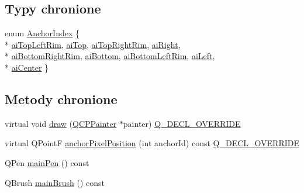 \subsection*{Typy chronione}
\begin{DoxyCompactItemize}
\item 
enum \hyperlink{class_q_c_p_item_ellipse_a415009889543169f35b70795f415e45e}{Anchor\+Index} \{ \\*
\hyperlink{class_q_c_p_item_ellipse_a415009889543169f35b70795f415e45eab2538849b88921e7fc1dcc15b2a6109d}{ai\+Top\+Left\+Rim}, 
\hyperlink{class_q_c_p_item_ellipse_a415009889543169f35b70795f415e45ea83e55b0c1799baac1eecab52bcbe096d}{ai\+Top}, 
\hyperlink{class_q_c_p_item_ellipse_a415009889543169f35b70795f415e45ea415d82233c14f0c70c245d50e706e75b}{ai\+Top\+Right\+Rim}, 
\hyperlink{class_q_c_p_item_ellipse_a415009889543169f35b70795f415e45ea0f0dcfdf87d9405b53b2129740fb6ba6}{ai\+Right}, 
\\*
\hyperlink{class_q_c_p_item_ellipse_a415009889543169f35b70795f415e45eab62732e96d67801d50c6a9bdebc374d0}{ai\+Bottom\+Right\+Rim}, 
\hyperlink{class_q_c_p_item_ellipse_a415009889543169f35b70795f415e45ea5894287dedaeec1f48394fd950ccff5b}{ai\+Bottom}, 
\hyperlink{class_q_c_p_item_ellipse_a415009889543169f35b70795f415e45ea7b8101bfc590af8ce32961f6545c4f90}{ai\+Bottom\+Left\+Rim}, 
\hyperlink{class_q_c_p_item_ellipse_a415009889543169f35b70795f415e45eae74dad00419a0e1f42877510158fb922}{ai\+Left}, 
\\*
\hyperlink{class_q_c_p_item_ellipse_a415009889543169f35b70795f415e45ea580ec0e9b9fd1488fccf5783e52c0c02}{ai\+Center}
 \}
\end{DoxyCompactItemize}
\subsection*{Metody chronione}
\begin{DoxyCompactItemize}
\item 
virtual void \hyperlink{class_q_c_p_item_ellipse_a77eebd67a402fc496082a2e51356928c}{draw} (\hyperlink{class_q_c_p_painter}{Q\+C\+P\+Painter} $\ast$painter) \hyperlink{qcustomplot_8hh_a42cc5eaeb25b85f8b52d2a4b94c56f55}{Q\+\_\+\+D\+E\+C\+L\+\_\+\+O\+V\+E\+R\+R\+I\+DE}
\item 
virtual Q\+PointF \hyperlink{class_q_c_p_item_ellipse_a35cd6983c61a16ac33c23f08dd2817cc}{anchor\+Pixel\+Position} (int anchor\+Id) const \hyperlink{qcustomplot_8hh_a42cc5eaeb25b85f8b52d2a4b94c56f55}{Q\+\_\+\+D\+E\+C\+L\+\_\+\+O\+V\+E\+R\+R\+I\+DE}
\item 
Q\+Pen \hyperlink{class_q_c_p_item_ellipse_afc78d49ed5ffa886bccf18f297f83d30}{main\+Pen} () const 
\item 
Q\+Brush \hyperlink{class_q_c_p_item_ellipse_a2a9757204877c9d0fd07adfb26d6b1d8}{main\+Brush} () const 
\end{DoxyCompactItemize}
